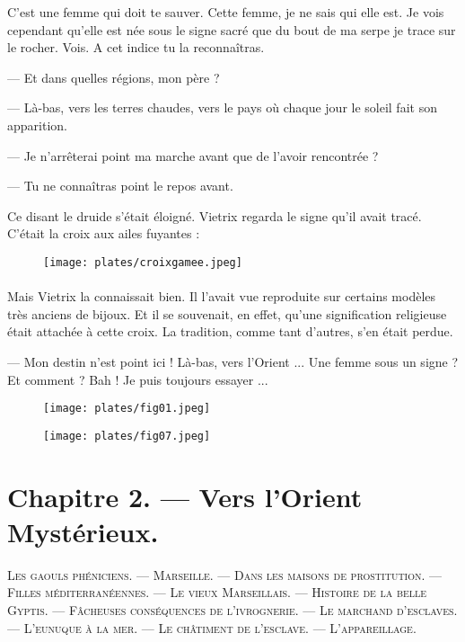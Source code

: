 \documentclass[a4paper, 11pt, oneside, polutonikogreek, french]{article}
\begin{document}
C'est une femme qui doit te sauver. Cette femme, je ne sais qui elle est. Je vois cependant qu'elle est née sous le signe sacré que du bout de ma serpe je trace sur le rocher. Vois. A cet indice tu la reconnaîtras.

--- Et dans quelles régions, mon père ?

--- Là-bas, vers les terres chaudes, vers le pays où chaque jour le soleil fait son apparition.

--- Je n'arrêterai point ma marche avant que de l'avoir rencontrée ?

--- Tu ne connaîtras point le repos avant.

Ce disant le druide s'était éloigné. Vietrix regarda le signe qu'il avait tracé. C'était la croix aux ailes fuyantes :

\begin{figure}[H]
\centering
\texttt{[image: plates/croixgamee.jpeg]}
\end{figure}
\paragraph{}
Mais Vietrix la connaissait bien. Il l'avait vue reproduite sur certains modèles très anciens de bijoux. Et il se souvenait, en effet, qu'une signification religieuse était attachée à cette croix. La tradition, comme tant d'autres, s'en était perdue.

--- Mon destin n'est point ici ! Là-bas, vers l'Orient ... Une femme sous un signe ? Et comment ? Bah ! Je puis toujours essayer ...

\begin{figure}[H]
\centering
\texttt{[image: plates/fig01.jpeg]}
\end{figure}
\clearpage
\begin{figure}[H]
\centering
\texttt{[image: plates/fig07.jpeg]}
\end{figure}
\section{Chapitre 2. --- Vers l'Orient Mystérieux.}
\begin{center}
\scshape
\small
Les gaouls phéniciens. --- Marseille. --- Dans les maisons de prostitution. --- Filles méditerranéennes. --- Le vieux Marseillais. --- Histoire de la belle Gyptis. --- Fâcheuses conséquences de l'ivrognerie. --- Le marchand d'esclaves. --- L'eunuque à la mer. --- Le châtiment de l'esclave. --- L'appareillage.
\end{center}
\end{document}
